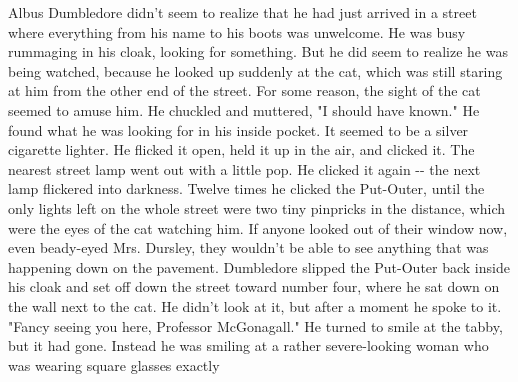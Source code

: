 \documentclass{article}%
\begin{document}
\newline%
Albus Dumbledore didn't seem to realize that he had just arrived in a
\newline%
street where everything from his name to his boots was unwelcome. He was
\newline%
busy rummaging in his cloak, looking for something. But he did seem to
\newline%
realize he was being watched, because he looked up suddenly at the cat,
\newline%
which was still staring at him from the other end of the street. For
\newline%
some reason, the sight of the cat seemed to amuse him. He chuckled and
\newline%
muttered, "I should have known."
\newline%
He found what he was looking for in his inside pocket. It seemed to be a
\newline%
silver cigarette lighter. He flicked it open, held it up in the air, and
\newline%
clicked it. The nearest street lamp went out with a little pop. He
\newline%
clicked it again {-}{-} the next lamp flickered into darkness. Twelve times
\newline%
he clicked the Put{-}Outer, until the only lights left on the whole street
\newline%
were two tiny pinpricks in the distance, which were the eyes of the cat
\newline%
watching him. If anyone looked out of their window now, even beady{-}eyed
\newline%
Mrs. Dursley, they wouldn't be able to see anything that was happening
\newline%
down on the pavement. Dumbledore slipped the Put{-}Outer back inside his
\newline%
cloak and set off down the street toward number four, where he sat down
\newline%
on the wall next to the cat. He didn't look at it, but after a moment he
\newline%
spoke to it.
\newline%
"Fancy seeing you here, Professor McGonagall."
\newline%
He turned to smile at the tabby, but it had gone. Instead he was smiling
\newline%
at a rather severe{-}looking woman who was wearing square glasses exactly
\end{document}
